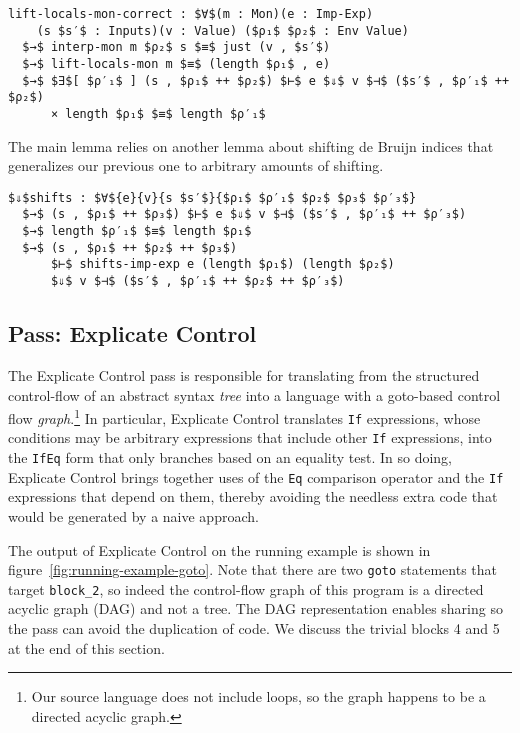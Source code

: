 \documentclass[sigplan,screen]{acmart}
\begin{document}
\begin{lstlisting}
lift-locals-mon-correct : $∀$(m : Mon)(e : Imp-Exp)
    (s $s′$ : Inputs)(v : Value) ($ρ₁$ $ρ₂$ : Env Value)
  $→$ interp-mon m $ρ₂$ s $≡$ just (v , $s′$)
  $→$ lift-locals-mon m $≡$ (length $ρ₁$ , e)
  $→$ $∃$[ $ρ′₁$ ] (s , $ρ₁$ ++ $ρ₂$) $⊢$ e $⇓$ v $⊣$ ($s′$ , $ρ′₁$ ++ $ρ₂$)
      × length $ρ₁$ $≡$ length $ρ′₁$
\end{lstlisting}

The main lemma relies on another lemma about shifting de Bruijn
indices that generalizes our previous one to arbitrary amounts of
shifting.

\begin{lstlisting}
$⇓$shifts : $∀${e}{v}{s $s′$}{$ρ₁$ $ρ′₁$ $ρ₂$ $ρ₃$ $ρ′₃$} 
  $→$ (s , $ρ₁$ ++ $ρ₃$) $⊢$ e $⇓$ v $⊣$ ($s′$ , $ρ′₁$ ++ $ρ′₃$)
  $→$ length $ρ′₁$ $≡$ length $ρ₁$
  $→$ (s , $ρ₁$ ++ $ρ₂$ ++ $ρ₃$)
      $⊢$ shifts-imp-exp e (length $ρ₁$) (length $ρ₂$)
      $⇓$ v $⊣$ ($s′$ , $ρ′₁$ ++ $ρ₂$ ++ $ρ′₃$)
\end{lstlisting}


\subsection{Pass: Explicate Control}

The Explicate Control pass is responsible for translating from the
structured control-flow of an abstract syntax \emph{tree} into a
language with a goto-based control flow \emph{graph}.\footnote{Our
source language does not include loops, so the graph happens to be a
directed acyclic graph.} In particular, Explicate Control translates
\lstinline{If} expressions, whose conditions may be arbitrary
expressions that include other \lstinline{If} expressions, into the
\lstinline{IfEq} form that only branches based on an equality test. In
so doing, Explicate Control brings together uses of the \lstinline{Eq}
comparison operator and the \lstinline{If} expressions that depend on
them, thereby avoiding the needless extra code that would be generated
by a naive approach.

The output of Explicate Control on the running example is shown in
figure~\ref{fig:running-example-goto}. Note that there are two
\lstinline{goto} statements that target \lstinline{block_2}, so indeed
the control-flow graph of this program is a directed acyclic graph
(DAG) and not a tree. The DAG representation enables sharing so the
pass can avoid the duplication of code. We discuss the trivial blocks
4 and 5 at the end of this section.
\end{document}
